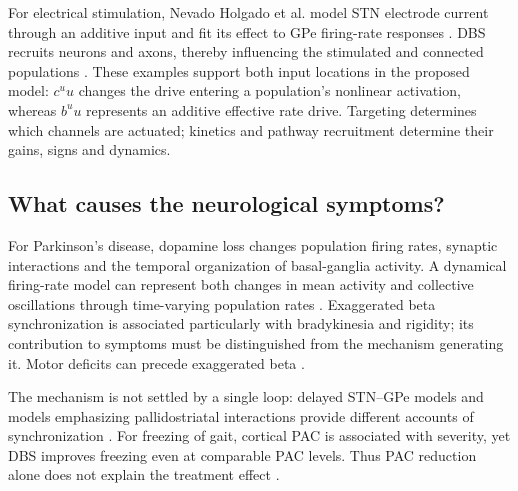 ﻿\documentclass[11pt,a4paper]{article}
\begin{document}
For electrical stimulation, Nevado Holgado et al. model STN electrode
current through an additive input and fit its effect to GPe firing-rate
responses \cite[PDF pp.~3--4, Eq.~5]{nevado2010}. DBS recruits neurons
and axons, thereby influencing the stimulated and connected
populations \cite{neumann2023}.
These examples support both input locations in the proposed model:
$c^u u$ changes the drive entering a population's nonlinear activation,
whereas $b^u u$ represents an additive effective rate drive.
Targeting determines which channels are actuated; kinetics and
pathway recruitment determine their gains, signs and dynamics.

\subsection*{What causes the neurological symptoms?}
For Parkinson's disease, dopamine loss changes population firing rates,
synaptic interactions and the temporal organization of basal-ganglia
activity. A dynamical firing-rate model can represent both changes in
mean activity and collective oscillations through time-varying
population rates \cite{nevado2010,lindi2024}. Exaggerated beta
synchronization is associated particularly with bradykinesia and
rigidity; its contribution to symptoms must be distinguished from the
mechanism generating it. Motor deficits can precede exaggerated beta
\cite{delacrompe2025,koeglsperger2026}.

The mechanism is not settled by a single loop: delayed STN--GPe models
and models emphasizing pallidostriatal interactions provide different
accounts of synchronization \cite{nevado2010,lindi2024,ortone2023}.
For freezing of gait, cortical PAC is associated with severity, yet DBS
improves freezing even at comparable PAC levels. Thus PAC reduction
alone does not explain the treatment effect \cite{yin2022}.
\end{document}
